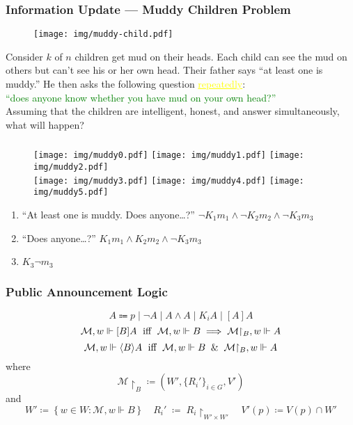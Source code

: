 \documentclass[UTF8,aspectratio=43,11pt,colorlinks,compress,openany]{beamer}%
\begin{document}
\begin{frame}\frametitle{Information Update --- Muddy Children Problem}
			\begin{figure}
				\texttt{[image: img/muddy-child.pdf]}
			\end{figure}\vspace{-1ex}
	\begin{problem}
		Consider $k$ of $n$ children get mud on their heads. Each child can see the mud on others but can't see his or her own head. Their father says ``at least one is muddy.'' He then asks the following question \textcolor{yellow}{\underline{repeatedly}}:\\
		\textcolor{green}{``does anyone know whether you have mud on your own head?''}\\
		Assuming that the children are intelligent, honest, and answer simultaneously, what will happen?
	\end{problem}
\end{frame}

\begin{frame}\frametitle{}
\begin{figure}[H]
\texttt{[image: img/muddy0.pdf]}
\texttt{[image: img/muddy1.pdf]}
\texttt{[image: img/muddy2.pdf]}\\
\texttt{[image: img/muddy3.pdf]}
\texttt{[image: img/muddy4.pdf]}\hspace*{2ex}
\texttt{[image: img/muddy5.pdf]}
\end{figure}
\begin{enumerate}
	\item ``At least one is muddy. Does anyone\dots?'' $\neg K_1m_1\wedge\neg K_2m_2\wedge\neg K_3m_3$
	\item ``Does anyone\dots?'' $K_1m_1\wedge K_2m_2\wedge\neg K_3m_3$
	\item $K_3\neg m_3$
\end{enumerate}
\end{frame}

\begin{frame}\frametitle{Public Announcement Logic}
\[A\Coloneqq p\mid \neg A\mid A\wedge A\mid K_i A\mid [A]A\]
\[\mathcal{M},w\Vdash[B]A \mbox{\; iff \;} \mathcal{M},w\Vdash B\implies\mathcal{M}{\restriction_B},w\Vdash A\]
\[\mathcal{M},w\Vdash\langle B\rangle A \mbox{\; iff \;} \mathcal{M},w\Vdash B\;\;\&\;\;\mathcal{M}{\restriction_B},w\Vdash A\]
where
\[\mathcal{M}{\restriction_B}\coloneqq \left(W',\{R_i'\}_{i\in G},V'\right)\] and 
\[W'\coloneqq \left\{w\in W: \mathcal{M},w\Vdash B\right\}\quad R_i'\;\coloneqq \;R_i\!{\restriction_{W'\times W'}} \quad V'(p)\coloneqq V(p)\cap W'\]
\end{frame}
\end{document}
